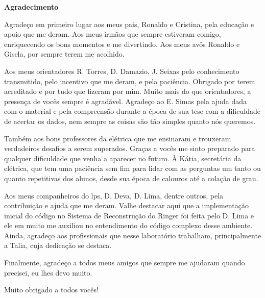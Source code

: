 \clearpage

\begin{center}
\textbf{\Large Agradecimento}
\end{center}

Agradeço em primeiro lugar aos meus pais, Ronaldo e Cristina, 
pela educação e apoio que me deram. Aos meus irmãos que sempre
estiveram comigo, enriquecendo os bons momentos e me divertindo. Aos meus 
avôs Ronaldo e Gisela, por sempre terem me acolhido.

Aos meus orientadores R. Torres, D. Damazio, J. Seixas pelo conhecimento
transmitido, pelo incentivo que me deram, e pela paciência. Obrigado 
por terem acreditado e por tudo que fizeram por mim. Muito mais do que
orientadores, a presença de vocês sempre é agradável. Agradeço ao E. Simas pela
ajuda dada com o material e pela compreensão durante a época de sua tese com a
dificuldade de acertar os dados, nem sempre as coisas são tão simples quanto nós
queremos.

Também aos bons professores da elétrica que me ensinaram e trouxeram 
verdadeiros desafios a serem superados. Graças a vocês me sinto preparado para
qualquer dificuldade que venha a aparecer no futuro.
À Kátia, secretária da elétrica, que tem uma paciência sem fim para lidar com as
perguntas um tanto ou quanto repetitivas dos alunos, desde sua época de calouros
até a colação de grau. 


Aos meus companheiros do \acrshort{lps}, D. Deva, D. Lima, 
dentre outros, pela contribuição e ajuda que me deram. Valhe destacar aqui que a
implementação inicial do código no Sistema de Reconstrução do Ringer foi feita pelo D. Lima
e ele em muito me auxiliou no entendimento do código complexo desse ambiente. 
Ainda, agradeço aos profissionais que nesse 
laboratório trabalham, principalmente a Talia, cuja dedicação se destaca.

Finalmente, agradeço a todos meus amigos que sempre me ajudaram quando precisei, 
eu lhes devo muito.

Muito obrigado a todos vocês!
